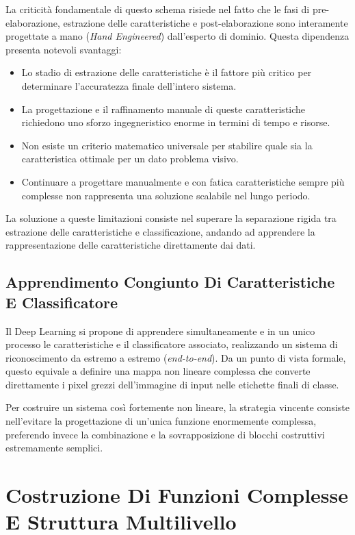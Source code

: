 ﻿\documentclass[11pt, a4paper]{article}
\begin{document}
La criticità fondamentale di questo schema risiede nel fatto che le fasi di pre-elaborazione, estrazione delle caratteristiche e post-elaborazione sono interamente progettate a mano (\emph{Hand Engineered}) dall'esperto di dominio. Questa dipendenza presenta notevoli svantaggi:
\begin{itemize}[noitemsep]
    \item Lo stadio di estrazione delle caratteristiche è il fattore più critico per determinare l'accuratezza finale dell'intero sistema.
    \item La progettazione e il raffinamento manuale di queste caratteristiche richiedono uno sforzo ingegneristico enorme in termini di tempo e risorse.
    \item Non esiste un criterio matematico universale per stabilire quale sia la caratteristica ottimale per un dato problema visivo.
    \item Continuare a progettare manualmente e con fatica caratteristiche sempre più complesse non rappresenta una soluzione scalabile nel lungo periodo.
\end{itemize}

La soluzione a queste limitazioni consiste nel superare la separazione rigida tra estrazione delle caratteristiche e classificazione, andando ad apprendere la rappresentazione delle caratteristiche direttamente dai dati.

\subsection{Apprendimento Congiunto Di Caratteristiche E Classificatore}

Il Deep Learning si propone di apprendere simultaneamente e in un unico processo le caratteristiche e il classificatore associato, realizzando un sistema di riconoscimento da estremo a estremo (\emph{end-to-end}). Da un punto di vista formale, questo equivale a definire una mappa non lineare complessa che converte direttamente i pixel grezzi dell'immagine di input nelle etichette finali di classe.

Per costruire un sistema così fortemente non lineare, la strategia vincente consiste nell'evitare la progettazione di un'unica funzione enormemente complessa, preferendo invece la combinazione e la sovrapposizione di blocchi costruttivi estremamente semplici.

\newpage

\section{Costruzione Di Funzioni Complesse E Struttura Multilivello}
\end{document}
